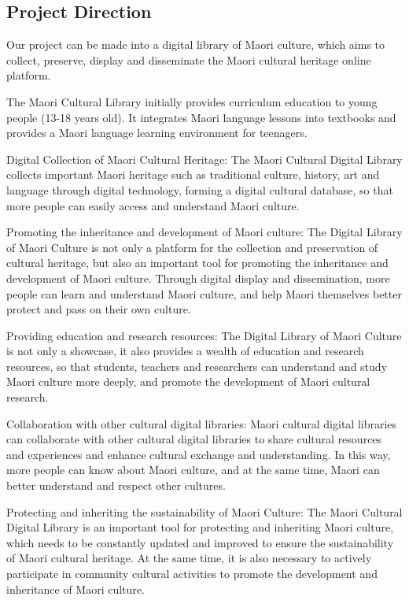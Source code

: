 \subsection{Project Direction}
Our project can be made into a digital library of Maori culture, which aims to collect, preserve, display and disseminate the Maori cultural heritage online platform.

The Maori Cultural Library initially provides curriculum education to young people (13-18 years old). It integrates Maori language lessons into textbooks and provides a Maori language learning environment for teenagers.

Digital Collection of Maori Cultural Heritage: The Maori Cultural Digital Library collects important Maori heritage such as traditional culture, history, art and language through digital technology, forming a digital cultural database, so that more people can easily access and understand Maori culture.

Promoting the inheritance and development of Maori culture: The Digital Library of Maori Culture is not only a platform for the collection and preservation of cultural heritage, but also an important tool for promoting the inheritance and development of Maori culture. Through digital display and dissemination, more people can learn and understand Maori culture, and help Maori themselves better protect and pass on their own culture.

Providing education and research resources: The Digital Library of Maori Culture is not only a showcase, it also provides a wealth of education and research resources, so that students, teachers and researchers can understand and study Maori culture more deeply, and promote the development of Maori cultural research.

Collaboration with other cultural digital libraries: Maori cultural digital libraries can collaborate with other cultural digital libraries to share cultural resources and experiences and enhance cultural exchange and understanding. In this way, more people can know about Maori culture, and at the same time, Maori can better understand and respect other cultures.

Protecting and inheriting the sustainability of Maori Culture: The Maori Cultural Digital Library is an important tool for protecting and inheriting Maori culture, which needs to be constantly updated and improved to ensure the sustainability of Maori cultural heritage. At the same time, it is also necessary to actively participate in community cultural activities to promote the development and inheritance of Maori culture.
 
